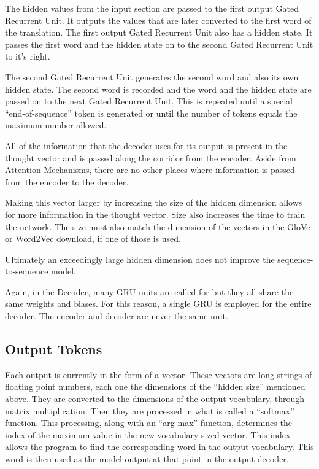 The hidden values from the input section are passed to the first output Gated Recurrent Unit. It outputs the values that are later converted to the first word of the translation. The first output Gated Recurrent Unit also has a hidden state. It passes the first word and the hidden state on to the second Gated Recurrent Unit to it's right.

The second Gated Recurrent Unit generates the second word and also its own hidden state. The second word is recorded and the word and the hidden state are passed on to the next Gated Recurrent Unit. This is repeated until a special ``end-of-sequence'' token is generated or until the number of tokens equals the maximum number allowed.



All of the information that the decoder uses for its output is present in the thought vector and is passed along the corridor from the encoder. 
Aside from Attention Mechanisms, there are no other places where information is passed from the encoder to the decoder.

Making this vector larger by increasing the size of the hidden dimension allows for more information in the thought vector. Size also increases the time to train the network. The size must also match the dimension of the vectors in the GloVe or Word2Vec download, if one of those is used. 

Ultimately an exceedingly large hidden dimension does not improve the sequence-to-sequence model.

Again, in the Decoder, many GRU units are called for but they all share the same weights and biases. For this reason, a single GRU is employed for the entire decoder. The encoder and decoder are never the same unit.

\subsection{Output Tokens}
Each output is currently in the form of a vector. These vectors are long strings of floating point numbers, each one the dimensions of the ``hidden size'' mentioned above. They are converted to the dimensions of the output vocabulary, through matrix multiplication. Then they are processed in what is called a ``softmax'' function. This processing, along with an ``arg-max'' function, determines the index of the maximum value in the new vocabulary-sized vector. This index allows the program to find the corresponding word in the output vocabulary. This word is then used as the model output at that point in the output decoder.


